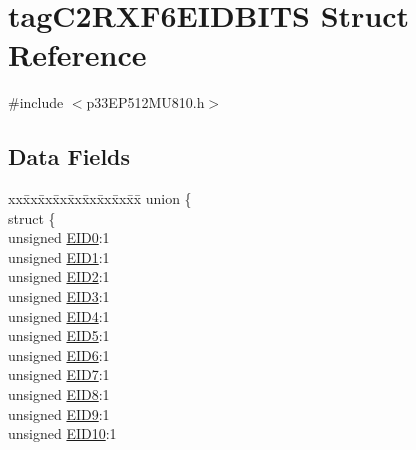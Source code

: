 \hypertarget{structtag_c2_r_x_f6_e_i_d_b_i_t_s}{}\section{tag\+C2\+R\+X\+F6\+E\+I\+D\+B\+I\+TS Struct Reference}
\label{structtag_c2_r_x_f6_e_i_d_b_i_t_s}


{\ttfamily \#include $<$p33\+E\+P512\+M\+U810.\+h$>$}

\subsection*{Data Fields}
\begin{DoxyCompactItemize}
\item 
\begin{tabbing}
xx\=xx\=xx\=xx\=xx\=xx\=xx\=xx\=xx\=\kill
union \{\\
\>struct \{\\
\>\>unsigned \hyperlink{structtag_c2_r_x_f6_e_i_d_b_i_t_s_a9da8b7b30247e4f9cd8cc056549aa9fd}{EID0}:1\\
\>\>unsigned \hyperlink{structtag_c2_r_x_f6_e_i_d_b_i_t_s_afd6c139491d147c1262f3d051c6691e9}{EID1}:1\\
\>\>unsigned \hyperlink{structtag_c2_r_x_f6_e_i_d_b_i_t_s_a36ec62d8d3c5acd5d15e6691dc099a94}{EID2}:1\\
\>\>unsigned \hyperlink{structtag_c2_r_x_f6_e_i_d_b_i_t_s_ab895f7d0ac289a0383b607cbc62eebe2}{EID3}:1\\
\>\>unsigned \hyperlink{structtag_c2_r_x_f6_e_i_d_b_i_t_s_a136d5a709d6618d40acceccb43036656}{EID4}:1\\
\>\>unsigned \hyperlink{structtag_c2_r_x_f6_e_i_d_b_i_t_s_a8dffb2d86a6c184df505ae7c71a58710}{EID5}:1\\
\>\>unsigned \hyperlink{structtag_c2_r_x_f6_e_i_d_b_i_t_s_af8a8574102515d8f1a4b7fd1685d0532}{EID6}:1\\
\>\>unsigned \hyperlink{structtag_c2_r_x_f6_e_i_d_b_i_t_s_a84c3262e67f8d5fd387ac10bde6fa9b1}{EID7}:1\\
\>\>unsigned \hyperlink{structtag_c2_r_x_f6_e_i_d_b_i_t_s_acca25e0b7d86eb499d01f85222baea87}{EID8}:1\\
\>\>unsigned \hyperlink{structtag_c2_r_x_f6_e_i_d_b_i_t_s_ac6748f73d4ada8538b06548be4f396c2}{EID9}:1\\
\>\>unsigned \hyperlink{structtag_c2_r_x_f6_e_i_d_b_i_t_s_a9cea8e77ecbb72bd3b08102412793725}{EID10}:1\\

\end{tabbing}
\end{DoxyCompactItemize}
